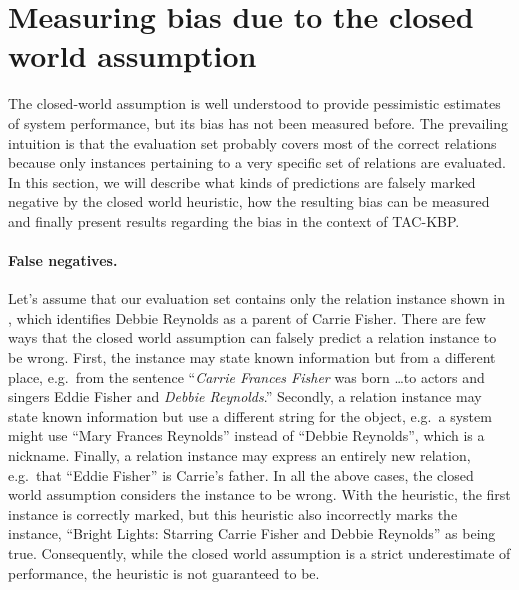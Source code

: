 \section{Measuring bias due to the closed world assumption}
\label{sec:analysis}


The closed-world assumption is well understood to provide pessimistic estimates of system performance, but its bias has not been measured before.
The prevailing intuition is that the evaluation set probably covers most of the correct relations because only instances pertaining to a very specific set of relations are evaluated.
In this section, we will describe what kinds of predictions are falsely marked negative by the closed world heuristic, how the resulting bias can be measured and finally present results regarding the bias in the context of TAC-KBP.

\paragraph{False negatives.}
Let's assume that our evaluation set contains only the relation instance shown in , which identifies Debbie Reynolds as a parent of Carrie Fisher.
There are few ways that the closed world assumption can falsely predict a relation instance to be wrong.
First, the instance may state known information but from a different place, e.g.\ from the sentence 
  ``\textit{Carrie Frances Fisher} was born \ldots to actors and singers Eddie Fisher and \textit{Debbie Reynolds}.''
Secondly, a relation instance may state known information but use a different string for the object, e.g.\ a system might use ``Mary Frances Reynolds'' instead of ``Debbie Reynolds'', which is a nickname.
Finally, a relation instance may express an entirely new relation, e.g.\ that ``Eddie Fisher'' is Carrie's father.
In all the above cases, the closed world assumption considers the instance to be wrong.
With the \anydoc heuristic, the first instance is correctly marked, but this heuristic also incorrectly marks the instance, ``Bright Lights: Starring Carrie Fisher and Debbie Reynolds'' as being true.
Consequently, 
  while the closed world assumption is a strict underestimate of performance, the \anydoc heuristic is not guaranteed to be.


